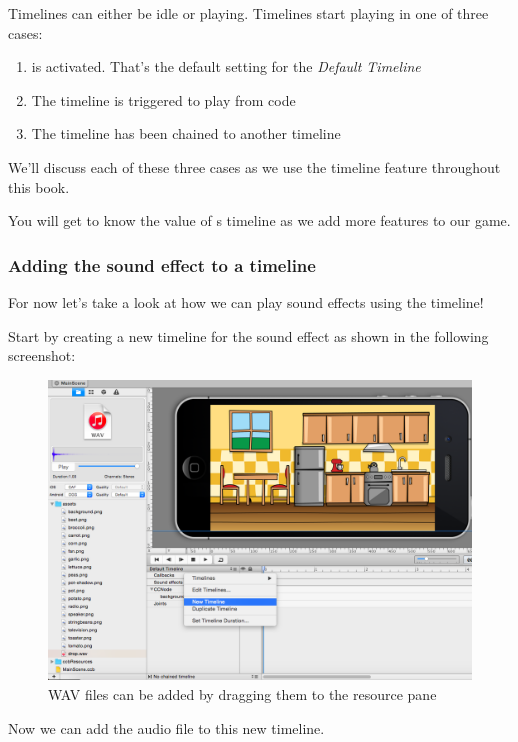 Timelines can either be idle or playing. Timelines start playing in one of three
cases:
\begin{enumerate}
  \item {} is activated. That's the default setting for the
  \textit{Default Timeline}
  \item The timeline is triggered to play from code
  \item The timeline has been chained to another timeline
\end{enumerate}

We'll discuss each of these three cases as we use the timeline feature
throughout this book. 

You will get to know the value of \SB{}s timeline as we add more features to our
game.

\subsubsection{Adding the sound effect to a timeline}
For now let's take a look at how we can play sound effects using the timeline!

\begin{leftbar}
Start by creating a new timeline for the sound effect as shown in the following
screenshot: 

\begin{figure}[H]
    \centering
    \includegraphics[width=0.9\linewidth]{images/Chapter2/new_timeline_audio.png}
    \caption{WAV files can be added by dragging them to the resource
    pane}\label{fig:audio_new_timeline}
\end{figure}
\end{leftbar}

Now we can add the audio file to this new timeline.

